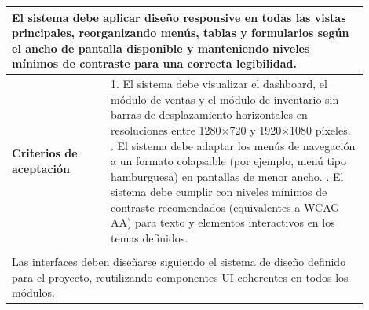\begin{longtable}{|p{0.25\linewidth}|p{0.15\linewidth}|p{0.15\linewidth}|p{0.35\linewidth}|}
		\multicolumn{4}{|p{0.96\linewidth}|}{%
		El sistema debe aplicar diseño responsive en todas las vistas principales, reorganizando menús, tablas y formularios según el ancho de pantalla disponible y manteniendo niveles mínimos de contraste para una correcta legibilidad.}                          \\ \hline
		\cellcolor{tableheaderblue}\textbf{Criterios de aceptación} & \multicolumn{3}{p{0.70\linewidth}|}{                                                                                                                                                             %
			1. El sistema debe visualizar el dashboard, el módulo de ventas y el módulo de inventario sin barras de desplazamiento horizontales en resoluciones entre 1280×720 y 1920×1080 píxeles. \newline
			2. El sistema debe adaptar los menús de navegación a un formato colapsable (por ejemplo, menú tipo hamburguesa) en pantallas de menor ancho. \newline
		3. El sistema debe cumplir con niveles mínimos de contraste recomendados (equivalentes a WCAG AA) para texto y elementos interactivos en los temas definidos.}                                                                                                 \\ \hline
		\rowcolor{tableheaderblue}
		\multicolumn{4}{|l|}{\textbf{Restricciones}}                                                                                                                                                                                                                   \\ \hline
		\multicolumn{4}{|p{0.96\linewidth}|}{%
		Las interfaces deben diseñarse siguiendo el sistema de diseño definido para el proyecto, reutilizando componentes UI coherentes en todos los módulos.}                                                                                                         \\ \hline
	
\end{longtable}
\endgroup


